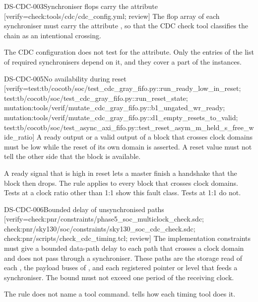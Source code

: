 \begin{requirement}{DS-CDC-003}{Synchroniser flops carry the attribute}
[verify={check:tools/cdc/cdc_config.yml; review}]
The flop array of each synchroniser must carry the attribute , so that the CDC check tool classifies the chain as an intentional crossing.
\end{requirement}
\begin{information}
The CDC configuration does not test for the attribute. Only the entries of the list of required synchronisers depend on it, and they cover a part of the instances.
\end{information}

\begin{requirement}{DS-CDC-005}{No availability during reset}
[verify={test:tb/cocotb/soc/test_cdc_gray_fifo.py::run_ready_low_in_reset; test:tb/cocotb/soc/test_cdc_gray_fifo.py::run_reset_state; mutation:tools/verif/mutate_cdc_gray_fifo.py::b1_ungated_wr_ready; mutation:tools/verif/mutate_cdc_gray_fifo.py::d1_empty_resets_to_valid; test:tb/cocotb/soc/test_async_axi_fifo.py::test_reset_asym_m_held_s_free_wide_ratio}]
A ready output or a valid output of a block that crosses clock domains must be low while the reset of its own domain is asserted. A reset value must not tell the other side that the block is available.
\end{requirement}
\begin{rationale}
A ready signal that is high in reset lets a master finish a handshake that the block then drops. The rule applies to every block that crosses clock domains. Tests at a clock ratio other than 1:1 show this fault class. Tests at 1:1 do not.
\end{rationale}

\begin{requirement}{DS-CDC-006}{Bounded delay of unsynchronised paths}
[verify={check:pnr/constraints/phase5_soc_multiclock_check.sdc; check:pnr/sky130/soc/constraints/sky130_soc_cdc_check.sdc; check:pnr/scripts/check_cdc_timing.tcl; review}]
The implementation constraints must give a bounded data-path delay to each path that crosses a clock domain and does not pass through a synchroniser. These paths are the storage read of each , the payload buses of , and each registered pointer or level that feeds a synchroniser. The bound must not exceed one period of the receiving clock.
\end{requirement}
\begin{information}
The rule does not name a tool command.  tells how each timing tool does it.
\end{information}

